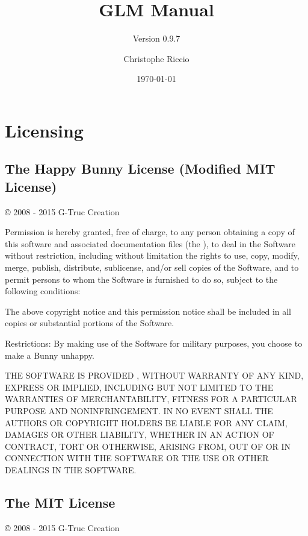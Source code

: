 \documentclass{scrartcl}
\numberwithin{figure}{subsection}
\begin{document}
\author{Christophe Riccio}
\subtitle{Version 0.9.7}

\title{GLM Manual}
\date{\today{}} %

\maketitle{} %

\pagebreak{}

\section*{Licensing}

\subsection*{\hypertarget{happybunny}{The Happy Bunny License (Modified MIT License)}}

\copyright{} 2008 - 2015 G-Truc Creation

Permission is hereby granted, free of charge, to any person obtaining a copy of this software and associated documentation files (the ), to deal in the Software without restriction, including without limitation the rights to use, copy, modify, merge, publish, distribute, sublicense, and/or sell copies of the Software, and to permit persons to whom the Software is furnished to do so, subject to the following conditions:

The above copyright notice and this permission notice shall be included in all copies or substantial portions of the Software.

Restrictions: By making use of the Software for military purposes, you choose to make a Bunny unhappy.

THE SOFTWARE IS PROVIDED , WITHOUT WARRANTY OF ANY KIND, EXPRESS OR IMPLIED, INCLUDING BUT NOT LIMITED TO THE WARRANTIES OF MERCHANTABILITY, FITNESS FOR A PARTICULAR PURPOSE AND NONINFRINGEMENT. IN NO EVENT SHALL THE AUTHORS OR COPYRIGHT HOLDERS BE LIABLE FOR ANY CLAIM, DAMAGES OR OTHER LIABILITY, WHETHER IN AN ACTION OF CONTRACT, TORT OR OTHERWISE, ARISING FROM, OUT OF OR IN CONNECTION WITH THE SOFTWARE OR THE USE OR OTHER DEALINGS IN THE SOFTWARE.

\pagebreak{}

\subsection*{\hypertarget{mit}{The MIT License}}
\copyright{} 2008 - 2015 G-Truc Creation
\end{document}
